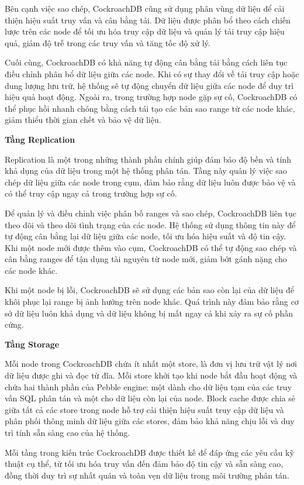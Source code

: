 \documentclass[14pt]{article}
\begin{document}
Bên cạnh việc sao chép, CockroachDB cũng sử dụng phân vùng dữ liệu để cải thiện hiệu suất truy vấn và cân bằng tải. Dữ liệu được phân bổ theo cách chiến lược trên các node để tối ưu hóa truy cập dữ liệu và quản lý tải truy cập hiệu quả, giảm độ trễ trong các truy vấn và tăng tốc độ xử lý.

Cuối cùng, CockroachDB có khả năng tự động cân bằng tải bằng cách liên tục điều chỉnh phân bổ dữ liệu giữa các node. Khi có sự thay đổi về tải truy cập hoặc dung lượng lưu trữ, hệ thống sẽ tự động chuyển dữ liệu giữa các node để duy trì hiệu quả hoạt động. Ngoài ra, trong trường hợp node gặp sự cố, CockroachDB có thể phục hồi nhanh chóng bằng cách tái tạo các bản sao range từ các node khác, giảm thiểu thời gian chết và bảo vệ dữ liệu.

\textbf{Tầng Replication}

Replication là một trong những thành phần chính giúp đảm bảo độ bền và tính khả dụng của dữ liệu trong một hệ thống phân tán. Tầng này quản lý việc sao chép dữ liệu giữa các node trong cụm, đảm bảo rằng dữ liệu luôn được bảo vệ và có thể truy cập ngay cả trong trường hợp sự cố.

Để quản lý và điều chỉnh việc phân bố ranges và sao chép, CockroachDB liên tục theo dõi và theo dõi tình trạng của các node. Hệ thống sử dụng thông tin này để tự động cân bằng lại dữ liệu giữa các node, tối ưu hóa hiệu suất và độ tin cậy. Khi một node mới được thêm vào cụm, CockroachDB có thể tự động sao chép và cân bằng ranges để tận dụng tài nguyên từ node mới, giảm bớt gánh nặng cho các node khác.

Khi một node bị lỗi, CockroachDB sẽ sử dụng các bản sao còn lại của dữ liệu để khôi phục lại range bị ảnh hưởng trên node khác. Quá trình này đảm bảo rằng cơ sở dữ liệu luôn khả dụng và dữ liệu không bị mất ngay cả khi xảy ra sự cố phần cứng.

\textbf{Tầng Storage}

Mỗi node trong CockroachDB chứa ít nhất một store, là đơn vị lưu trữ vật lý nơi dữ liệu được ghi và đọc từ đĩa. Mỗi store khởi tạo khi node bắt đầu hoạt động và chứa hai thành phần của Pebble engine: một dành cho dữ liệu tạm của các truy vấn SQL phân tán và một cho dữ liệu còn lại của node. Block cache được chia sẻ giữa tất cả các store trong node hỗ trợ cải thiện hiệu suất truy cập dữ liệu và phân phối thông minh dữ liệu giữa các stores, đảm bảo khả năng chịu lỗi và duy trì tính sẵn sàng cao của hệ thống.

Mỗi tầng trong kiến trúc CockroachDB được thiết kế để đáp ứng các yêu cầu kỹ thuật cụ thể, từ tối ưu hóa truy vấn đến đảm bảo độ tin cậy và sẵn sàng cao, đồng thời duy trì sự nhất quán và toàn vẹn dữ liệu trong môi trường phân tán.
\end{document}

